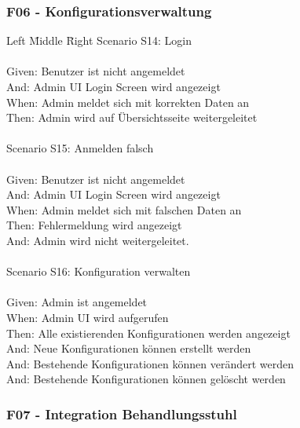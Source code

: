 \subsubsection*{F06 - Konfigurationsverwaltung}
\begin{tabbing}
    Left \= Middle \= Right \kill
    Scenario S14: \> \>  Login\\ \\
    Given: \> \>  Benutzer ist nicht angemeldet\\
    And: \> \>    Admin UI Login Screen wird angezeigt\\
    When: \> \>   Admin meldet sich mit korrekten Daten an\\
    Then: \> \>   Admin wird auf Übersichtsseite weitergeleitet\\ \\

    Scenario S15: \> \>  Anmelden falsch\\ \\
    Given: \> \>  Benutzer ist nicht angemeldet\\
    And: \> \>    Admin UI Login Screen wird angezeigt\\
    When: \> \>   Admin meldet sich mit falschen Daten an\\
    Then: \> \>   Fehlermeldung wird angezeigt\\
    And: \> \>   Admin wird nicht weitergeleitet.\\ \\

    Scenario S16: \> \>  Konfiguration verwalten \\ \\
    Given: \> \>  Admin ist angemeldet\\
    When: \> \>  Admin UI wird aufgerufen\\
    Then: \> \>  Alle existierenden Konfigurationen werden angezeigt\\
    And: \> \>  Neue Konfigurationen können erstellt werden\\
    And: \> \>  Bestehende Konfigurationen können verändert werden\\
    And: \> \>  Bestehende Konfigurationen können gelöscht werden\\
\end{tabbing}

\subsubsection*{F07 - Integration Behandlungsstuhl}

